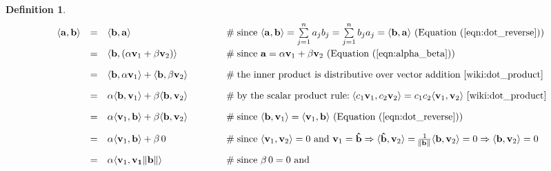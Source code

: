\documentclass{article}
\theoremstyle{definition}
\newtheorem{definition}{Definition}[section]
\begin{document}
\begin{definition}
\begin{equation*}
\begin{array}{lllll}
\langle \mathbf{a}, \mathbf{b} \rangle
&=& \langle \mathbf{b}, \mathbf{a} \rangle
					&\hspace{3em} \mathrel{\#} \text{since }
					\langle \mathbf{a}, \mathbf{b} \rangle  = 
					\sum\limits_{j = 1}^{n} a_j b_j = 
					\sum\limits_{j = 1}^{n} b_j a_j = 
					\langle \mathbf{b}, \mathbf{a} \rangle
					\text{ (Equation (\ref{eqn:dot_reverse}))} \\
[10pt]
&=& \langle \mathbf{b}, (\alpha \mathbf{v}_1 + \beta \mathbf{v}_2) \rangle
					&\hspace{3em} \mathrel{\#} \text{since } \mathbf{a} = \alpha \mathbf{v}_1 + 
					\beta \mathbf{v}_2 \text{ (Equation (\ref{eqn:alpha_beta}))} \\
[10pt]
&=& \langle \mathbf{b}, \alpha \mathbf{v}_1 \rangle + \langle \mathbf{b}, \beta \mathbf{v}_2 \rangle
					&\hspace{3em} \mathrel{\#} \text{the inner product is distributive 
					over vector addition \cite{wiki:dot_product}} \\
[10pt]
&=& \alpha \langle \mathbf{b},\mathbf{v}_1 \rangle + \beta  \langle \mathbf{b}, \mathbf{v}_2 \rangle
					&\hspace{3em} \mathrel{\#} \text{by the scalar product rule:
					$\! \langle c_{1}\mathbf{v}_1, c_{2}\mathbf{v}_2 \rangle
					= c_{1} c_{2} \langle \mathbf{v}_1, \mathbf{v}_2 \rangle$ \cite{wiki:dot_product}} \\
[10pt]
&=& \alpha \langle \mathbf{v}_{1},\mathbf{b} \rangle + \beta  \langle \mathbf{b}, \mathbf{v}_2 \rangle
					&\hspace{3em} \mathrel{\#} \text{since $\langle \mathbf{b}, \mathbf{v}_1 \rangle 
					= \langle \mathbf{v}_{1},\mathbf{b} \rangle$ (Equation (\ref{eqn:dot_reverse}))} \\
[10pt]
&=& \alpha \langle \mathbf{v}_1, \mathbf{b}\rangle + \beta \, 0
					&\hspace{3em} \mathrel{\#} \text{since }  \langle \mathbf{v}_1, \mathbf{v}_2 \rangle = 0 
					\text{ and } \mathbf{v}_1 = \mathbf{\hat{b}} 
					\Rightarrow \langle \mathbf{\hat{b}}, \mathbf{v}_2  \rangle
					= \frac{1}{\norm{\mathbf{b}}}  \langle \mathbf{b}, \mathbf{v}_2  \rangle
					= 0 
					\Rightarrow  \langle \mathbf{b}, \mathbf{v}_2  \rangle
					= 0 \\
[10pt]
&=& \alpha \langle \mathbf{v}_1, \mathbf{v_1} \norm{\mathbf{b}} \rangle
					&\hspace{3em} \mathrel{\#} \text{since $\beta \, 0 = 0$ and
}
\end{array}
\end{equation*}
\end{definition}
\end{document}
